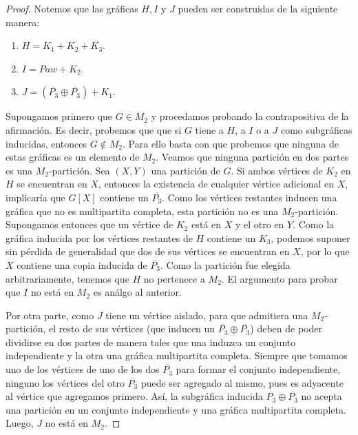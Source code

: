 \begin{proof}

  Notemos que las gráficas $H, I$ y $J$ pueden ser construidas de la siguiente manera:

  \begin{enumerate}[(1)]
      \item $H = K_1 + K_2 + K_3$.
      \item $I = Paw + K_2$.
      \item $J = (\overline{P_3} \oplus \overline{P_3}) + K_1$.
  \end{enumerate}

  Supongamos primero que $G \in M_2$ y procedamos probando la contrapositiva
  de la afirmación. Es decir, probemos que que si $G$ tiene a $H$, a $I$
  o a $J$ como subgráficas inducidas, entonces $G \notin M_2$. Para ello basta
  con que probemos que ninguna de estas gráficas es un elemento de $M_2$.
  Veamos que ninguna partici\'on en dos partes es una $M_2$-partici\'on.
  Sea $(X,Y)$ una partici\'on de $G$. Si ambos vértices de $K_2$ en $H$
  se encuentran en $X$, entonces la existencia de cualquier vértice adicional
  en $X$, implicar\'ia que $G[X]$ contiene un $\overline{P_3}$. Como los
  vértices restantes inducen una gráfica que no es multipartita completa,
  esta partici\'on no es una $M_2$-partici\'on. Supongamos entonces que un
  v\'ertice de $K_2$ est\'a en $X$ y el otro en $Y$. Como la gráfica inducida
  por los vértices restantes de $H$ contiene un $K_3$, podemos suponer sin
  p\'erdida de generalidad que dos de sus v\'ertices se encuentran en $X$,
  por lo que $X$ contiene una copia inducida de $\overline{P_3}$. Como la
  partici\'on fue elegida arbitrariamente, tenemos que $H$ no pertenece a
  $M_2$. El argumento para probar que $I$ no está en $M_2$ es an\'algo al
  anterior.

  Por otra parte, como $J$ tiene un vértice aislado, para que admitiera
  una $M_2$-partici\'on, el resto de sus vértices (que inducen un
  $\overline{P_3} \oplus \overline{P_3}$) deben de poder dividirse en dos
  partes de manera tales que una induzca un conjunto independiente y la otra
  una gráfica multipartita completa. Siempre que tomamos uno de los vértices
  de uno de los dos $\overline{P_3}$ para formar el conjunto independiente,
  ninguno los vértices del otro $\overline{P_3}$ puede ser agregado al mismo,
  pues es adyacente al vértice que agregamos primero. Así, la subgráfica
  inducida $\overline{P_3} \oplus \overline{P_3}$ no acepta una partición en
  un conjunto independiente y una gráfica multipartita completa. Luego, $J$
  no está en $M_2$.


\end{proof}
